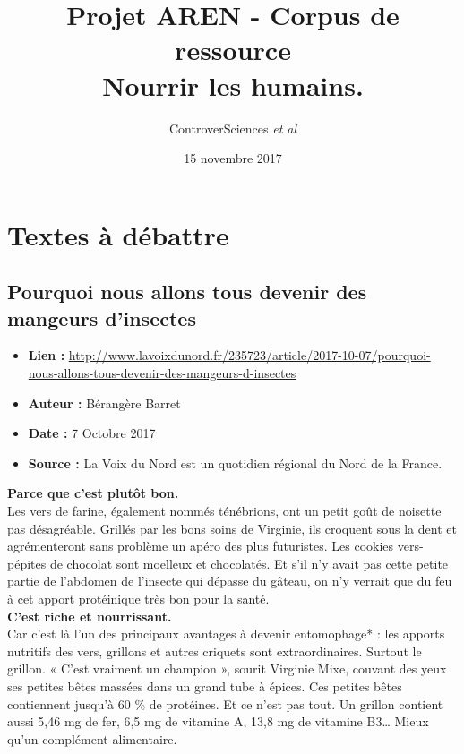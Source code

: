 \documentclass[8pt]{article}
\author{ControverSciences\textit{ et al} }
\title{Projet AREN - Corpus de ressource \\  Nourrir les humains.}
\date{15 novembre 2017}
\begin{document}
\maketitle

\tableofcontents
\newpage
\section{Textes à débattre}
\subsection{Pourquoi nous allons tous devenir des mangeurs d’insectes}
\begin{itemize}
	\item \textbf{Lien : }  \url{http://www.lavoixdunord.fr/235723/article/2017-10-07/pourquoi-nous-allons-tous-devenir-des-mangeurs-d-insectes} 
	\item \textbf{Auteur : } Bérangère Barret
	\item \textbf{Date : } 7 Octobre 2017
	\item \textbf{Source : } La Voix du Nord est un quotidien régional du Nord de la France.
\end{itemize}

\textbf{Parce que c’est plutôt bon.}\\

Les vers de farine, également nommés ténébrions, ont un petit goût de noisette pas désagréable. Grillés par les bons soins de Virginie, ils croquent sous la dent et agrémenteront sans problème un apéro des plus futuristes. Les cookies vers-pépites de chocolat sont moelleux et chocolatés. Et s’il n’y avait pas cette petite partie de l’abdomen de l’insecte qui dépasse du gâteau, on n’y verrait que du feu à cet apport protéinique très bon pour la santé.\\

\textbf{C’est riche et nourrissant.}\\

Car c’est là l’un des principaux avantages à devenir entomophage* : les apports nutritifs des vers, grillons et autres criquets sont extraordinaires. Surtout le grillon. «  C’est vraiment un champion  », sourit Virginie Mixe, couvant des yeux ses petites bêtes massées dans un grand tube à épices. Ces petites bêtes contiennent jusqu’à 60 \% de protéines. Et ce n’est pas tout. Un grillon contient aussi 5,46 mg de fer, 6,5 mg de vitamine A, 13,8 mg de vitamine B3… Mieux qu’un complément alimentaire.\\
\end{document}
